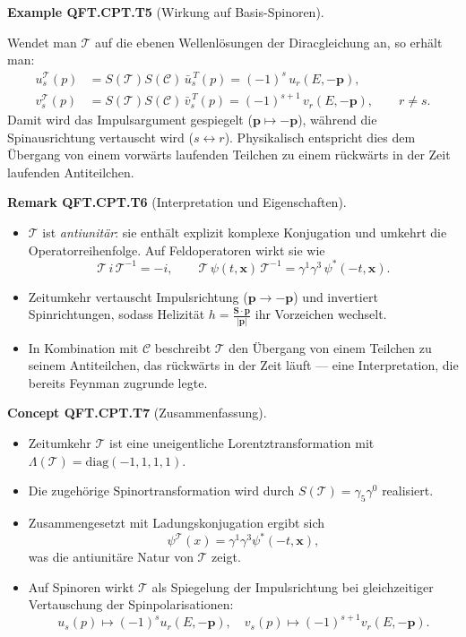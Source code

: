 \documentclass[10pt, letterpaper]{article}
\newcommand{\CustomHeading}[3]{%
  \par\medskip\noindent%
  \textbf{#1 #2} \textnormal{(#3)}.\enskip%
}
\newenvironment{REM}[2]{\begin{unitbox}\CustomHeading{Remark}{#1}{#2}}{\end{unitbox}}
\newenvironment{EXA}[2]{\begin{unitbox}\CustomHeading{Example}{#1}{#2}}{\end{unitbox}}
\newenvironment{CONC}[2]{\begin{unitbox}\CustomHeading{Concept}{#1}{#2}}{\end{unitbox}}
\begin{document}
\begin{EXA}{QFT.CPT.T5}{Wirkung auf Basis-Spinoren}
Wendet man $\mathcal T$ auf die ebenen Wellenlösungen der Diracgleichung an, so erhält man:
\[
\begin{aligned}
u_s^{\mathcal T}(p)
&= S(\mathcal T)S(\mathcal C)\,\bar u_s^{\,T}(p)
= (-1)^s\,u_r(E,-\mathbf p),\\[4pt]
v_s^{\mathcal T}(p)
&= S(\mathcal T)S(\mathcal C)\,\bar v_s^{\,T}(p)
= (-1)^{s+1}\,v_r(E,-\mathbf p),
\qquad r\neq s.
\end{aligned}
\]
Damit wird das Impulsargument gespiegelt ($\mathbf p\mapsto -\mathbf p$), während die Spinausrichtung vertauscht wird ($s\leftrightarrow r$).  
Physikalisch entspricht dies dem Übergang von einem vorwärts laufenden Teilchen zu einem rückwärts in der Zeit laufenden Antiteilchen.
\end{EXA}

\begin{REM}{QFT.CPT.T6}{Interpretation und Eigenschaften}
\begin{itemize}
  \item $\mathcal T$ ist \emph{antiunitär}: sie enthält explizit komplexe Konjugation und umkehrt die Operatorreihenfolge.  
    Auf Feldoperatoren wirkt sie wie
    \[
    \mathcal T\,i\,\mathcal T^{-1} = -i,\qquad
    \mathcal T\,\psi(t,\mathbf x)\,\mathcal T^{-1}
    = \gamma^1\gamma^3\,\psi^*(-t,\mathbf x).
    \]
  \item Zeitumkehr vertauscht Impulsrichtung ($\mathbf p\to -\mathbf p$) und invertiert Spinrichtungen, sodass Helizität $h=\frac{\mathbf S\cdot\mathbf p}{|\mathbf p|}$ ihr Vorzeichen wechselt.
  \item In Kombination mit $\mathcal C$ beschreibt $\mathcal T$ den Übergang von einem Teilchen zu seinem Antiteilchen, das rückwärts in der Zeit läuft — eine Interpretation, die bereits Feynman zugrunde legte.
\end{itemize}
\end{REM}

\begin{CONC}{QFT.CPT.T7}{Zusammenfassung}
\begin{itemize}
  \item Zeitumkehr $\mathcal T$ ist eine uneigentliche Lorentztransformation mit $\Lambda(\mathcal T)=\mathrm{diag}(-1,1,1,1)$.
  \item Die zugehörige Spinortransformation wird durch $S(\mathcal T)=\gamma_5\gamma^0$ realisiert.
  \item Zusammengesetzt mit Ladungskonjugation ergibt sich
  \[
  \psi^{\mathcal T}(x)=\gamma^1\gamma^3\psi^*(-t,\mathbf x),
  \]
  was die antiunitäre Natur von $\mathcal T$ zeigt.
  \item Auf Spinoren wirkt $\mathcal T$ als Spiegelung der Impulsrichtung bei gleichzeitiger Vertauschung der Spinpolarisationen:
  \[
  u_s(p)\mapsto(-1)^s u_r(E,-\mathbf p),\quad
  v_s(p)\mapsto(-1)^{s+1}v_r(E,-\mathbf p).
  \]
\end{itemize}
\end{CONC}
\end{document}
